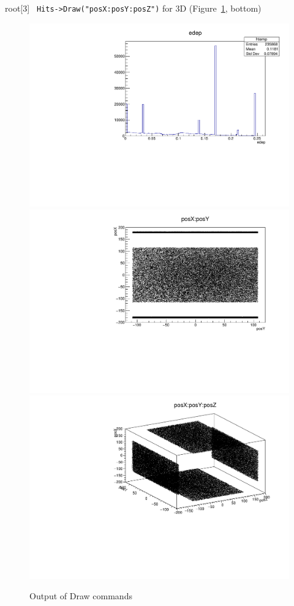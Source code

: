 \documentclass[12pt]{article}
\begin{document}
root[3] \verb| Hits->Draw("posX:posY:posZ")| for 3D (Figure~\ref{fig:1Dhist}, bottom)\\
\begin{figure}[h]
\centering
\includegraphics[scale=0.37]{figs/1Dhist.pdf} \\
\includegraphics[scale=0.37]{figs/2Dhist.pdf} \\
\includegraphics[scale=0.37]{figs/3Dhist.pdf}
\caption{Output of Draw commands}
\label{fig:1Dhist}
\end{figure}
\clearpage
\end{document}
